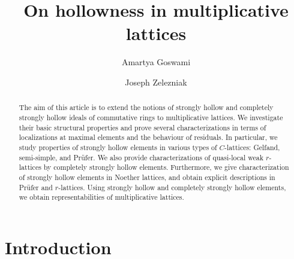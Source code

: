 \documentclass[11pt,english]{amsart}
\theoremstyle{definition}
\numberwithin{equation}{section}
\theoremstyle{remark}
\begin{document}
	
	\title{On hollowness in multiplicative lattices}
	
	\author{Amartya Goswami}
	\address{A. Goswami: [1]  Department of Mathematics and Applied Mathematics, University of Johannesburg, P.O. Box 524, Auckland Park 2006, South Africa. [2]  National Institute for Theoretical and Computational Sciences (NITheCS), South Africa.}
	
	\author{Joseph Zelezniak}
	
	\address{J. Zelezniak: Department of Mathematics and Applied Mathematics, University of Cape Town, Rondebosch 7700, South Africa}
	
	
	
	
	
	\begin{abstract}
		The aim of this article is to extend the notions of strongly hollow and completely strongly hollow ideals of commutative rings to multiplicative lattices.  We investigate their basic structural properties and prove several characterizations in terms of localizations at maximal elements and the behaviour of residuals. In particular, we study properties of strongly hollow elements in various types of
		$C$-lattices: Gelfand, semi-simple, and Pr\"ufer. We also provide characterizations of quasi-local weak $r$-lattices by completely strongly hollow elements. Furthermore, we give characterization of strongly hollow elements in Noether lattices, and obtain explicit descriptions in Pr\"ufer and 
		$r$-lattices. Using strongly hollow and completely strongly hollow elements, we obtain representabilities of multiplicative lattices.
	\end{abstract}
	
	\maketitle 
	
	\section{Introduction}
	
\end{document}
